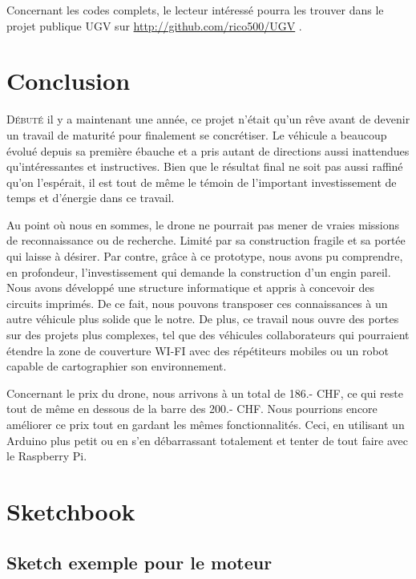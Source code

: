 \documentclass[a4paper,11pt]{report}
\begin{document}
{Concernant les codes complets, le lecteur intéressé pourra les trouver dans le projet publique UGV sur \url{http://github.com/rico500/UGV} .

\chapter{Conclusion}

\lettrine{D}{ébuté} il y a maintenant une année, ce projet n'était qu'un rêve avant de devenir un travail de maturité pour finalement se concrétiser. Le véhicule a beaucoup évolué depuis sa première ébauche et a pris autant de directions aussi inattendues qu'intéressantes et instructives. Bien que le résultat final ne soit pas aussi raffiné qu'on l'espérait, il est tout de même le témoin de l'important investissement de temps et d'énergie dans ce travail.

Au point où nous en sommes, le drone ne pourrait pas mener de vraies missions de reconnaissance ou de recherche. Limité par sa construction fragile et sa portée qui laisse à désirer. Par contre, grâce à ce prototype, nous avons pu comprendre, en profondeur, l'investissement qui demande la construction d'un engin pareil. Nous avons développé une structure informatique et appris à concevoir des circuits imprimés. De ce fait, nous pouvons transposer ces connaissances à un autre véhicule plus solide que le notre. De plus, ce travail nous ouvre des portes sur des projets plus complexes, tel que des véhicules collaborateurs qui pourraient étendre la zone de couverture WI-FI avec des répétiteurs mobiles ou un robot capable de cartographier son environnement.

Concernant le prix du drone, nous arrivons à un total de 186.- CHF, ce qui reste tout de même en dessous de la barre des 200.- CHF. Nous pourrions encore améliorer ce prix tout en gardant les mêmes fonctionnalités. Ceci, en utilisant un Arduino plus petit ou en s'en débarrassant totalement et tenter de tout faire avec le Raspberry Pi. 

\clearpage

\appendix

\chapter{Sketchbook}

\section{Sketch exemple pour le moteur}


}
\end{document}
